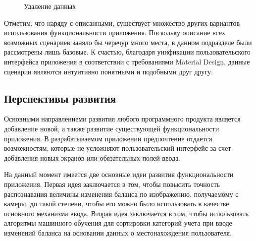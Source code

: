 \begin{figure}[h!]
  \centering
  \caption{Удаление данных}
  \label{fig:implementation_manual_remove}
\end{figure}

Отметим, что наряду с описанными, существует множество других вариантов
использования функциональности приложения.
Поскольку описание всех возможных сценариев заняло бы
черечур много места, в данном подразделе были рассмотрены лишь базовые.
К счастью, благодаря унификации пользовательского интерфейса приложения
в соответствии с требованиями Material Design, данные сценарии являются
интуитивно понятными и подобными друг другу.

\subsection{Перспективы развития}

Основными направлениеми развития любого программного продукта является
добавление новой, а также развитие существующей функциональности приложения.
В разрабатываемом приложении предпочтение отдается возможностям,
которые не усложняют пользовательский интерфейс за счет добавления новых экранов
или обязательных полей ввода.

На данный момент имеется две основные идеи развития функциональности приложения.
Первая идея заключается в том, чтобы повысить точность распознавания величины
изменения баланса по изображению, получаемому с камеры, до такой степени, чтобы
его можно было использовать в качестве основного механизма ввода.
Вторая идея заключается в том, чтобы использовать алгоритмы машинного обучения
для сортировки категорий учета при вводе изменений баланса на основании
данных о местонахождения пользователя.
